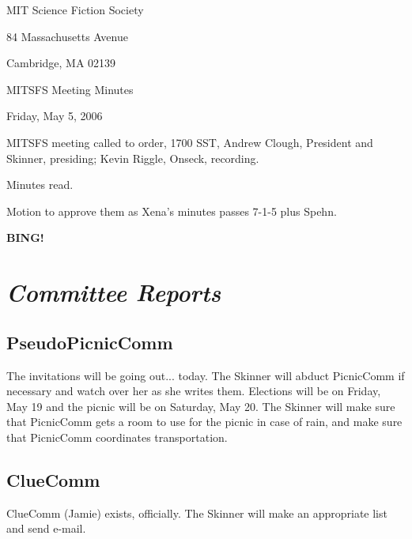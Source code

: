 \documentclass[10pt]{article}
\newcommand{\bing}{{\bf BING!} }
\newcommand{\goto}[1]{\bing \vskip 12pt \section*{{\em{#1}}}}
\newcommand{\ps}{ plus Spehn\xspace}
\begin{document}
\begin{center}

MIT Science Fiction Society

84 Massachusetts Avenue

Cambridge, MA 02139

\vspace{12pt}

MITSFS Meeting Minutes

Friday, May 5, 2006

\end{center}

\vspace{18pt}

\setlength{\parskip}{6pt}

\noindent
MITSFS meeting called to order, 1700 SST,
Andrew Clough, President and Skinner, presiding; Kevin Riggle, Onseck, recording.

Minutes read.

Motion to approve them as Xena's minutes passes 7-1-5\ps.

\goto{Committee Reports}

\subsection*{PseudoPicnicComm}
The invitations will be going out... today.  The Skinner will abduct PicnicComm if necessary and
watch over her as she writes them.  Elections will be on Friday, May 19 and the picnic will be on
Saturday, May 20.  The Skinner will make sure that PicnicComm gets a room to use for the picnic in
case of rain, and make sure that PicnicComm coordinates transportation.

\subsection*{ClueComm}
ClueComm (Jamie) exists, officially.  The Skinner will make an appropriate list and send e-mail.



\end{document}

